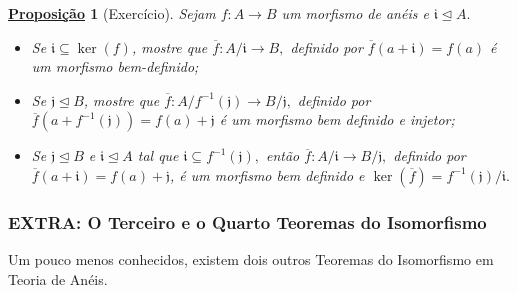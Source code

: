 \documentclass{article}
\newtheorem*{prop*}{\underline{Proposi\c c\~ao}}
\begin{document}
\begin{prop*}[Exercício]
  Sejam \(f:A\rightarrow B\) um morfismo de anéis e \(\mathfrak{i}\trianglelefteq{A}.\)
  \begin{itemize}
    \item[1)] Se \(\mathfrak{i}\subseteq \ker{(f)}\), mostre que \(\overline{f}:A/\mathfrak{i}\rightarrow B,\) definido por \(\overline{f}(a+\mathfrak{i}) = f(a)\) é 
      um morfismo bem-definido;
    \item[2)] Se \(\mathfrak{j}\trianglelefteq{B}\), mostre que \(\overline{f}:A/f^{-1}(\mathfrak{j})\rightarrow B/\mathfrak{j},\) definido por
      \(\overline{f}(a+f^{-1}(\mathfrak{j})) = f(a) + \mathfrak{j}\) é um morfismo bem definido e injetor;
    \item[3)] Se \(\mathfrak{j}\trianglelefteq{B}\) e \(\mathfrak{i}\trianglelefteq{A}\) tal que \(\mathfrak{i}\subseteq f^{-1}(\mathfrak{j}),\) então
      \(\overline{f}:A/\mathfrak{i}\rightarrow B/\mathfrak{j}, \) definido por \(\overline{f}(a+\mathfrak{i})=f(a)+\mathfrak{j}\),
      é um morfismo bem definido e \(\ker{(\overline{f})} = f^{-1}(\mathfrak{j})/\mathfrak{i}.\)
  \end{itemize}
\end{prop*}
\subsubsection{EXTRA: O Terceiro e o Quarto Teoremas do Isomorfismo}
  Um pouco menos conhecidos, existem dois outros Teoremas do Isomorfismo em Teoria de Anéis. 
\end{document}
